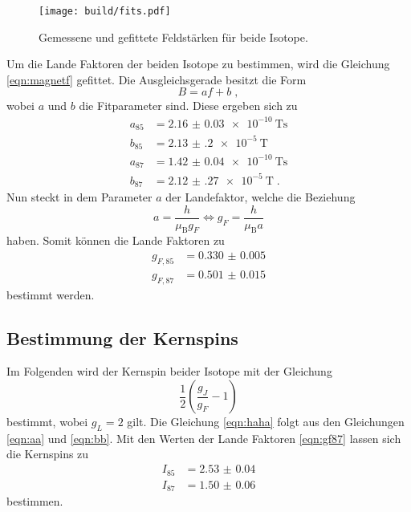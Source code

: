 \begin{figure}
    \centering
    \caption{Gemessene und gefittete Feldstärken für beide Isotope.}
    \label{fig:fit}
    \texttt{[image: build/fits.pdf]}
\end{figure}
Um die Lande Faktoren der beiden Isotope zu bestimmen, wird die Gleichung \eqref{eqn:magnetf} gefittet.
Die Ausgleichsgerade besitzt die Form
\begin{equation*}
    B =  af + b \; ,
\end{equation*} 
wobei $a$ und $b$ die Fitparameter sind.
Diese ergeben sich zu 
\begin{align*}
    a_{85} &= \qty{2.16(3)e-10}{\tesla\second}   \\
    b_{85} &= \qty{2.13(20)e-5}{\tesla}            \\
    a_{87} &= \qty{1.42(4)e-10}{\tesla\second}   \\
    b_{87} &= \qty{2.12(27)e-5}{\tesla}            \; .
\end{align*}
Nun steckt in dem Parameter $a$ der Landefaktor, welche die Beziehung 
\begin{equation*}
    a = \frac{h}{\mu_\text{B}g_F} \iff g_F = \frac{h}{\mu_\text{B}a}
\end{equation*}
haben.
Somit können die Lande Faktoren zu 
\begin{align}
    g_{F, 85} &= \num{0.330(5)} \\ 
    g_{F, 87} &= \num{0.501(15)}    \label{eqn:gf87}
\end{align}
bestimmt werden.
\subsection{Bestimmung der Kernspins}
Im Folgenden wird der Kernspin beider Isotope mit der Gleichung 
\begin{equation}
    \frac{1}{2}\left ( \frac{g_J}{g_F} - 1 \right ) \label{eqn:haha}
\end{equation}
bestimmt, wobei 
$g_L  = 2 $ gilt.
Die Gleichung \eqref{eqn:haha} folgt aus den Gleichungen \eqref{eqn:aa} und \eqref{eqn:bb}.
Mit den Werten der Lande Faktoren \eqref{eqn:gf87} lassen sich die Kernspins zu 
\begin{align*}
    I_{85} &= \num{2.53(4)} \\ 
    I_{87} &= \num{1.50(6)}  
\end{align*}
bestimmen.
